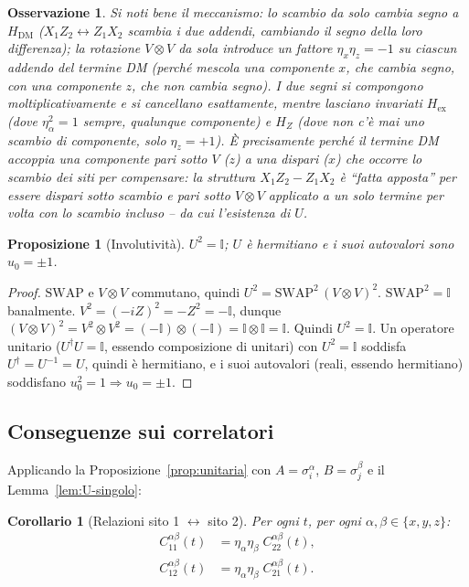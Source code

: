 \documentclass[11pt,a4paper]{article}
\newtheorem{proposizione}{Proposizione}
\newtheorem{corollario}{Corollario}
\newtheorem{osservazione}{Osservazione}
\begin{document}
\begin{osservazione}
Si noti bene il meccanismo: lo scambio da solo cambia segno a $H_{\mathrm{DM}}$
($X_1Z_2\leftrightarrow Z_1X_2$ scambia i due addendi, cambiando il segno della loro
differenza); la rotazione $V\otimes V$ da sola introduce un fattore $\eta_x\eta_z=-1$ su
\emph{ciascun} addendo del termine DM (perché mescola una componente $x$, che cambia segno, con
una componente $z$, che non cambia segno). I due segni si compongono moltiplicativamente e si
cancellano esattamente, mentre lasciano invariati $H_{\mathrm{ex}}$ (dove $\eta_\alpha^2=1$
sempre, qualunque componente) e $H_Z$ (dove non c'è mai uno scambio di componente, solo
$\eta_z=+1$). È precisamente perché il termine DM accoppia una componente pari sotto $V$ ($z$)
a una dispari ($x$) che occorre lo scambio dei siti per compensare: la struttura
$X_1Z_2-Z_1X_2$ è ``fatta apposta'' per essere dispari sotto scambio e pari sotto $V\otimes V$
applicato a un solo termine per volta con lo scambio incluso -- da cui l'esistenza di $U$.
\end{osservazione}

\begin{proposizione}[Involutività]
\label{prop:U2}
$U^2=\mathbb I$; $U$ è hermitiano e i suoi autovalori sono $u_0=\pm1$.
\end{proposizione}

\begin{proof}
$\mathrm{SWAP}$ e $V\otimes V$ commutano, quindi $U^2=\mathrm{SWAP}^2\,(V\otimes V)^2$.
$\mathrm{SWAP}^2=\mathbb I$ banalmente. $V^2=(-iZ)^2=-Z^2=-\mathbb I$, dunque
$(V\otimes V)^2=V^2\otimes V^2=(-\mathbb I)\otimes(-\mathbb I)=\mathbb I\otimes\mathbb I=\mathbb I$.
Quindi $U^2=\mathbb I$. Un operatore unitario ($U^\dagger U=\mathbb I$, essendo composizione di
unitari) con $U^2=\mathbb I$ soddisfa $U^\dagger=U^{-1}=U$, quindi è hermitiano, e i suoi
autovalori (reali, essendo hermitiano) soddisfano $u_0^2=1\Rightarrow u_0=\pm1$.
\end{proof}

\subsection{Conseguenze sui correlatori}

Applicando la Proposizione~\ref{prop:unitaria} con $A=\sigma_i^\alpha$, $B=\sigma_j^\beta$ e il
Lemma~\ref{lem:U-singolo}:

\begin{corollario}[Relazioni sito 1 $\leftrightarrow$ sito 2]
\label{cor:U-correlatori}
Per ogni $t$, per ogni $\alpha,\beta\in\{x,y,z\}$:
\begin{align}
C_{11}^{\alpha\beta}(t) &= \eta_\alpha\eta_\beta\; C_{22}^{\alpha\beta}(t),
\label{eq:cor-auto} \\
C_{12}^{\alpha\beta}(t) &= \eta_\alpha\eta_\beta\; C_{21}^{\alpha\beta}(t).
\label{eq:cor-incrociato}
\end{align}
\end{corollario}
\end{document}

